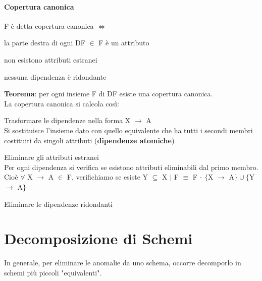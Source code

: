 \documentclass[10pt]{book}
\begin{document}
\paragraph{Copertura canonica} F è detta copertura canonica $\Leftrightarrow$ \begin{list}{}{}
	\item la parte destra di ogni DF $\in$ F è un attributo
	\item non esistono attributi estranei
	\item nessuna dipendenza è ridondante
\end{list}
\textbf{Teorema}: per ogni insieme F di DF esiste una copertura canonica.\\
La copertura canonica si calcola così:
\begin{list}{}{}
	\item Trasformare le dipendenze nella forma X $\rightarrow$ A\\
Si sostituisce l'insieme dato con quello equivalente che ha tutti i secondi membri costituiti da singoli attributi (\textbf{dipendenze atomiche})
	\item Eliminare gli attributi estranei\\
Per ogni dipendenza si verifica se esistono attributi eliminabili dal primo membro. Cioè $\forall$ X $\rightarrow$ A $\in$ F, verifichiamo se esiste Y $\subseteq$ X $|$ F $\equiv$ F - $\{$X $\rightarrow$ A$\}\cup\{$Y $\rightarrow$ A$\}$
	\item Eliminare le dipendenze ridondanti
\end{list}
\section{Decomposizione di Schemi}
In generale, per eliminare le anomalie da uno schema, occorre decomporlo in schemi più piccoli "equivalenti".
\end{document}
